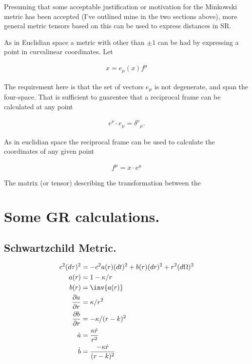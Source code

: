 \documentclass{article}      %
\newcommand{\PD}[2]{\frac{\partial {#2}}{\partial {#1}}}
\newcommand{\CC}[0]{c^2}
\newcommand{\adot}[0]{\dot{a}}
\newcommand{\bdot}[0]{\dot{b}}
\newcommand{\rdot}[0]{\dot{r}}
\begin{document}
Presuming that some acceptable justification or motivation for the Minkowski metric has been accepted (I've outlined mine in the two sections above),
more general metric tensors based on this can be used to express distances in SR. 

As in Euclidian space a metric with other than $\pm 1$ can be had by expressing a point in curvalinear coordinates.  Let

\begin{align*}
x = e_\mu(x) f^{\mu}
\end{align*}

The requirement here is that the set of vectors ${e_\mu}$ is not degenerate, and span the four-space.  That is sufficient to guarentee that a 
reciprocal frame can be calculated at any point

\begin{align*}
e^\nu \cdot e_\mu = {\delta^\nu}_\mu.
\end{align*}

As in euclidian space the reciprocal frame can be used to calculate the coordinates of any given point

\begin{align*}
f^{\mu} = x \cdot e^\mu
\end{align*}

The matrix (or tensor) describing the transformation between the 

%
%

\section{ Some GR calculations. }

\subsection{ Schwartzchild Metric. } 

\begin{align}
\CC (d\tau)^2 &= -\CC a(r) (dt)^2 + {b(r)} (dr)^2 + r^2(d\Omega)^2 \\
a(r) &= 1 - \kappa/r \\
b(r) &= \inv{a(r)} \\
\PD{r}{a} &= \kappa/r^2 \\
\PD{r}{b} &= -\kappa/(r-k)^2 \\
\adot &= \frac{\kappa \rdot}{r^2} \\
\bdot &= \frac{-\kappa \rdot}{(r-k)^2}
\end{align}
\end{document}
